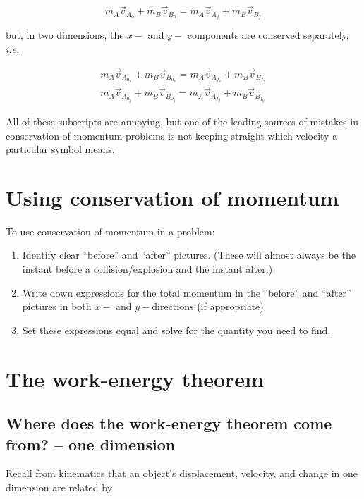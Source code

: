 \documentclass[10pt]{article}
\begin{document}
\begin{equation*}
m_A\vec v_{A_0} + m_B\vec v_{B_0} = m_A\vec v_{A_f} + m_B\vec v_{B_f}
\end{equation*}

but, in two dimensions, the $x-$ and $y-$ components are conserved separately, {\it i.e.}

\begin{align}
m_{A}\vec v_{A_{0_x}} + m_B\vec v_{B_{0_x}} = m_A\vec v_{A_{f_x}} + m_B\vec v_{B_{f_x}} \nonumber \\
m_{A}\vec v_{A_{0_y}} + m_B\vec v_{B_{0_y}} = m_A\vec v_{A_{f_y}} + m_B\vec v_{B_{f_y}}
\end{align}

All of these subscripts are annoying, but one of the leading sources of mistakes in conservation of momentum problems is not keeping straight which velocity a particular symbol means.

\section{Using conservation of momentum}

To use conservation of momentum in a problem:

\begin{enumerate}
	\item Identify clear ``before'' and ``after'' pictures. (These will almost always be the instant before a collision/explosion and the instant after.)
	\item Write down expressions for the total momentum in the ``before'' and ``after'' pictures in both $x-$ and $y-$directions (if appropriate)
	\item Set these expressions equal and solve for the quantity you need to find. 
\end{enumerate}


\section{The work-energy theorem}


\subsection{Where does the work-energy theorem come from? -- one dimension}


Recall from kinematics that an object's displacement, velocity, and change in one dimension are related by 
\end{document}
